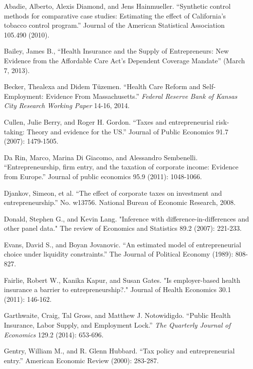 \documentclass[12pt]{article}
\begin{document}
\newpage

\begin{thebibliography}{99}

Abadie, Alberto, Alexis Diamond, and Jens Hainmueller. ``Synthetic control methods for comparative case studies: Estimating the effect of California’s tobacco control program.'' Journal of the American Statistical Association 105.490 (2010).

Bailey, James B., ``Health Insurance and the Supply of Entrepreneurs: New Evidence from the Affordable Care Act's Dependent Coverage Mandate'' (March 7, 2013). 

Becker, Thealexa and Didem T\"{u}zemen. ``Health Care Reform and Self-Employment: Evidence From Massachusetts.'' \emph{Federal Reserve Bank of Kansas City Research Working Paper} 14-16, 2014.

Cullen, Julie Berry, and Roger H. Gordon. ``Taxes and entrepreneurial risk-taking: Theory and evidence for the US.'' Journal of Public Economics 91.7 (2007): 1479-1505.

Da Rin, Marco, Marina Di Giacomo, and Alessandro Sembenelli. ``Entrepreneurship, firm entry, and the taxation of corporate income: Evidence from Europe.'' Journal of public economics 95.9 (2011): 1048-1066.

Djankov, Simeon, et al. ``The effect of corporate taxes on investment and entrepreneurship.'' No. w13756. National Bureau of Economic Research, 2008.

Donald, Stephen G., and Kevin Lang. "Inference with difference-in-differences and other panel data." The review of Economics and Statistics 89.2 (2007): 221-233.

Evans, David S., and Boyan Jovanovic. ``An estimated model of entrepreneurial choice under liquidity constraints.'' The Journal of Political Economy (1989): 808-827.

Fairlie, Robert W., Kanika Kapur, and Susan Gates. "Is employer-based health insurance a barrier to entrepreneurship?." Journal of Health Economics 30.1 (2011): 146-162.

Garthwaite, Craig, Tal Gross, and Matthew J. Notowidigdo. ``Public Health Insurance, Labor Supply, and Employment Lock.'' \emph{The Quarterly Journal of Economics} 129.2 (2014): 653-696.

Gentry, William M., and R. Glenn Hubbard. ``Tax policy and entrepreneurial entry.'' American Economic Review (2000): 283-287.


\end{thebibliography}
\end{document}
